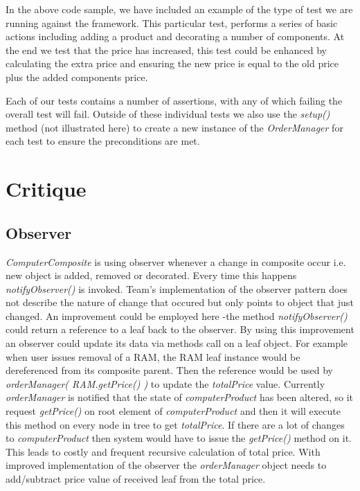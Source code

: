 \documentclass[pdftex,11pt,a4paper]{article}
\begin{document}


In the above code sample, we have included an example of the type of test we are running against the framework. This particular test, performs a series of basic actions including adding a product and decorating a number of components. At the end we test that the price has increased, this test could be enhanced by calculating the extra price and ensuring the new price is equal to the old price plus the added components price.

Each of our tests contains a number of assertions, with any of which failing the overall test will fail. Outside of these individual tests we also use the \emph{setup()} method (not illustrated here) to create a new instance of the \emph{OrderManager} for each test to ensure the preconditions are met.
\pagebreak


\section{Critique}
\subsection{Observer}
\emph{ComputerComposite} is using observer whenever a change in composite occur i.e. new object is added, removed or decorated. Every time this happens \emph{notifyObserver()} is invoked. Team's implementation of the observer pattern does not describe the nature of change that occured but only points to object that just changed. An improvement could be employed here -the method \emph{notifyObserver()} could return a reference to a leaf back to the observer. By using this improvement an observer could update its data via methods call on a leaf object. For example when user issues removal of a RAM, the RAM leaf instance would be dereferenced from its composite parent. Then the reference would be used by \emph{orderManager( RAM.getPrice() )} to update the \emph{totalPrice} value.
Currently \emph{orderManager} is notified that the state of \emph{computerProduct} has been altered, so it request \emph{getPrice()} on root element of \emph{computerProduct} and then it will execute this method on every node in tree to get \emph{totalPrice}.
If there are a lot of changes to \emph{computerProduct} then system would have to issue the \emph{getPrice()} method on it. This leads to costly and frequent recursive calculation of total price. With improved implementation of the observer the \emph{orderManager} object needs to add/subtract price value of received leaf from the total price.
\end{document}
